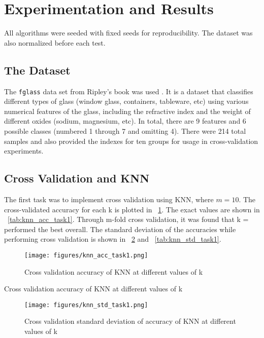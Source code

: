 \documentclass[paper=a4, fontsize=11pt,twoside]{scrartcl}	%
\newcommand{\figref}[1]{\figurename~\ref{#1}}
\newcommand{\tabref}[1]{\tablename~\ref{#1}}
\begin{document}
\section{Experimentation and Results}
All algorithms were seeded with fixed seeds for reproducibility. The dataset was also normalized before each test.

\subsection{The Dataset}
The \texttt{fglass} data set from Ripley's book was used \cite{Ripley1996PatternRipley}. It is a dataset that classifies different types of glass (window glass, containers, tableware, etc) using various numerical features of the glass, including the refractive index and the weight of different oxides (sodium, magnesium, etc). In total, there are 9 features and 6 possible classes (numbered 1 through 7 and omitting 4). There were 214 total samples and \cite{Ripley1996PatternRipley} also provided the indexes for ten groups for usage in cross-validation experiments.

\subsection{Cross Validation and KNN}
The first task was to implement cross validation using KNN, where $m=10$. The cross-validated accuracy for each k is plotted in \figref{fig:knn_acc_task1}. The exact values are shown in \tabref{tab:knn_acc_task1}. Through m-fold cross validation, it was found that k = performed the best overall. The standard deviation of the accuracies while performing cross validation is shown in \figref{fig:knn_std_task1} and \tabref{tab:knn_std_task1}.

\begin{figure}[!t!h]
	\centering
	\texttt{[image: figures/knn\_acc\_task1.png]}
	\caption{Cross validation accuracy of KNN at different values of k}
	\label{fig:knn_acc_task1}
\end{figure}

\begin{table}[!t!h]
	\centering

\caption{Cross validation accuracy of KNN at different values of k}
\label{tab:knn_acc_task1}
\end{table}

\begin{figure}[!t!h]
	\centering
	\texttt{[image: figures/knn\_std\_task1.png]}
	\caption{Cross validation standard deviation of accuracy of KNN at different values of k}
	\label{fig:knn_std_task1}
\end{figure}
\end{document}
